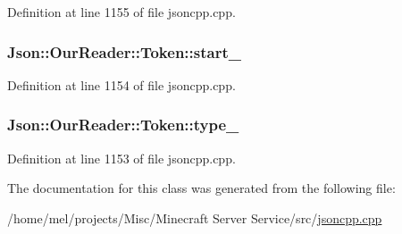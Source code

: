 Definition at line 1155 of file jsoncpp.\+cpp.

\subsubsection[{\texorpdfstring{start\+\_\+}{start_}}]{ Json\+::\+Our\+Reader\+::\+Token\+::start\+\_\+}\hypertarget{class_json_1_1_our_reader_1_1_token_aedf68bb00eaaa9d3c22b9825999602ac}{}\label{class_json_1_1_our_reader_1_1_token_aedf68bb00eaaa9d3c22b9825999602ac}


Definition at line 1154 of file jsoncpp.\+cpp.

\subsubsection[{\texorpdfstring{type\+\_\+}{type_}}]{ Json\+::\+Our\+Reader\+::\+Token\+::type\+\_\+}\hypertarget{class_json_1_1_our_reader_1_1_token_abe7d858530396fa7e1293f7a579880ed}{}\label{class_json_1_1_our_reader_1_1_token_abe7d858530396fa7e1293f7a579880ed}


Definition at line 1153 of file jsoncpp.\+cpp.



The documentation for this class was generated from the following file\+:\begin{DoxyCompactItemize}
\item 
/home/mel/projects/\+Misc/\+Minecraft Server Service/src/\hyperlink{jsoncpp_8cpp}{jsoncpp.\+cpp}\end{DoxyCompactItemize}
